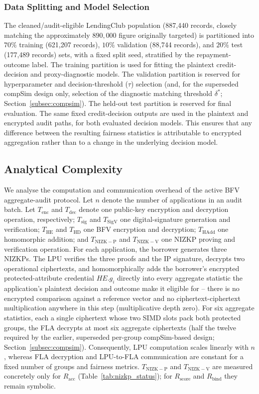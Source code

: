 \documentclass[a4paper,fleqn]{cas-dc}
\begin{document}
\subsubsection{Data Splitting and Model Selection} The cleaned/audit-eligible LendingClub population (887{,}440 records, closely matching the approximately $890{,}000$ figure originally targeted) is partitioned into $70\%$ training (621{,}207 records), $10\%$ validation (88{,}744 records), and $20\%$ test (177{,}489 records) sets, with a fixed split seed, stratified by the repayment-outcome label. The training partition is used for fitting the plaintext credit-decision and proxy-diagnostic models. The validation partition is reserved for hyperparameter and decision-threshold ($\tau$) selection (and, for the superseded compSim design only, selection of the diagnostic matching threshold $\delta^{*}$; Section~\ref{subsec:compsim}). The held-out test partition is reserved for final evaluation. The same fixed credit-decision outputs are used in the plaintext and encrypted audit paths, for both evaluated decision models. This ensures that any difference between the resulting fairness statistics is attributable to encrypted aggregation rather than to a change in the underlying decision model.


\subsection{Analytical Complexity} \label{subsec:complexity} We analyse the computation and communication overhead of the active BFV aggregate-audit protocol. Let $n$ denote the number of applications in an audit batch. Let $T_{\mathrm{enc}}$ and $T_{\mathrm{dec}}$ denote one public-key encryption and decryption operation, respectively; $T_{\mathrm{sig}}$ and $T_{\mathrm{SigV}}$ one digital-signature generation and verification; $T_{\mathrm{HE}}$ and $T_{\mathrm{HD}}$ one BFV encryption and decryption; $T_{\mathrm{HAdd}}$ one homomorphic addition; and $T_{\mathrm{NIZK-P}}$ and $T_{\mathrm{NIZK-V}}$ one NIZKP proving and verification operation. For each application, the borrower generates three NIZKPs. The LPU verifies the three proofs and the IP signature, decrypts two operational ciphertexts, and homomorphically adds the borrower's encrypted protected-attribute credential $HE.g_i$ directly into every aggregate statistic the application's plaintext decision and outcome make it eligible for -- there is no encrypted comparison against a reference vector and no ciphertext-ciphertext multiplication anywhere in this step (multiplicative depth zero). For six aggregate statistics, each a single ciphertext whose two SIMD slots pack both protected groups, the FLA decrypts at most six aggregate ciphertexts (half the twelve required by the earlier, superseded per-group compSim-based design; Section~\ref{subsec:compsim}). Consequently, LPU computation scales linearly with $n$, whereas FLA decryption and LPU-to-FLA communication are constant for a fixed number of groups and fairness metrics. $T_{\mathrm{NIZK-P}}$ and $T_{\mathrm{NIZK-V}}$ are measured concretely only for $R_{\mathrm{acc}}$ (Table~\ref{tab:nizkp_status}); for $R_{\mathrm{score}}$ and $R_{\mathrm{bind}}$ they remain symbolic. 
\end{document}
